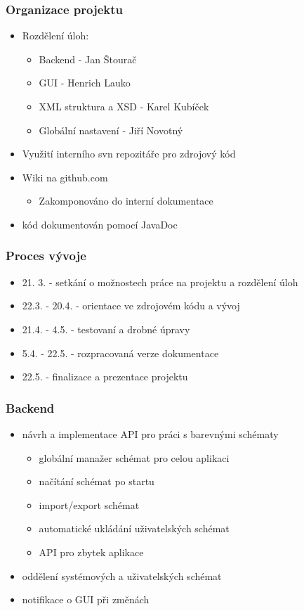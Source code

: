\documentclass[slovak]{beamer}
\begin{document}
\begin{frame}
\frametitle{Organizace projektu}
	\begin{itemize}
		\item Rozdělení úloh:
		\begin{itemize}
			\item Backend - Jan Štourač
			\item GUI - Henrich Lauko
			\item XML struktura a XSD - Karel Kubíček
			\item Globální nastavení - Jiří Novotný
		\end{itemize}
		\item Využití interního svn repozitáře pro zdrojový kód
		\item Wiki na github.com
		\begin{itemize}
			\item Zakomponováno do interní dokumentace
		\end{itemize}
		\item kód dokumentován pomocí JavaDoc
	\end{itemize}
\end{frame}

\begin{frame}
\frametitle{Proces vývoje}
	\begin{itemize}
		\item 21. 3. - setkání o možnostech práce na projektu a rozdělení úloh
		\item 22.3. - 20.4. - orientace ve zdrojovém kódu a vývoj
		\item 21.4. - 4.5. - testovaní a drobné úpravy
		\item 5.4. - 22.5. - rozpracovaná verze dokumentace
		\item 22.5. - finalizace a prezentace projektu
	\end{itemize}
\end{frame}

\begin{frame}
\frametitle{Backend}
	\begin{itemize}
		\item návrh a implementace API pro práci s barevnými schématy
		\begin{itemize}
			\item globální manažer schémat pro celou aplikaci
			\item načítání schémat po startu
			\item import/export schémat
			\item automatické ukládání uživatelských schémat
			\item API pro zbytek aplikace
		\end{itemize}
		\item oddělení systémových a uživatelských schémat
		\item notifikace o GUI při změnách
	\end{itemize}
\end{frame}
\end{document}
